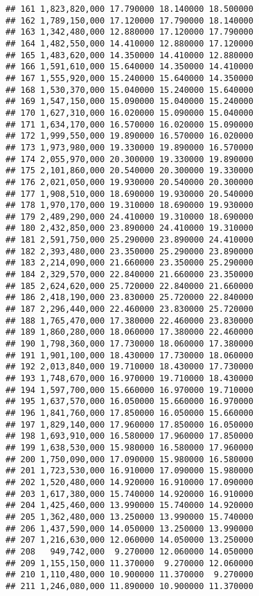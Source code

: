 \documentclass[]{article}
\begin{document}
\begin{verbatim}
## 161 1,823,820,000 17.790000 18.140000 18.500000
## 162 1,789,150,000 17.120000 17.790000 18.140000
## 163 1,342,480,000 12.880000 17.120000 17.790000
## 164 1,482,550,000 14.410000 12.880000 17.120000
## 165 1,483,620,000 14.350000 14.410000 12.880000
## 166 1,591,610,000 15.640000 14.350000 14.410000
## 167 1,555,920,000 15.240000 15.640000 14.350000
## 168 1,530,370,000 15.040000 15.240000 15.640000
## 169 1,547,150,000 15.090000 15.040000 15.240000
## 170 1,627,310,000 16.020000 15.090000 15.040000
## 171 1,634,170,000 16.570000 16.020000 15.090000
## 172 1,999,550,000 19.890000 16.570000 16.020000
## 173 1,973,980,000 19.330000 19.890000 16.570000
## 174 2,055,970,000 20.300000 19.330000 19.890000
## 175 2,101,860,000 20.540000 20.300000 19.330000
## 176 2,021,050,000 19.930000 20.540000 20.300000
## 177 1,908,510,000 18.690000 19.930000 20.540000
## 178 1,970,170,000 19.310000 18.690000 19.930000
## 179 2,489,290,000 24.410000 19.310000 18.690000
## 180 2,432,850,000 23.890000 24.410000 19.310000
## 181 2,591,750,000 25.290000 23.890000 24.410000
## 182 2,393,480,000 23.350000 25.290000 23.890000
## 183 2,214,090,000 21.660000 23.350000 25.290000
## 184 2,329,570,000 22.840000 21.660000 23.350000
## 185 2,624,620,000 25.720000 22.840000 21.660000
## 186 2,418,190,000 23.830000 25.720000 22.840000
## 187 2,296,440,000 22.460000 23.830000 25.720000
## 188 1,765,470,000 17.380000 22.460000 23.830000
## 189 1,860,280,000 18.060000 17.380000 22.460000
## 190 1,798,360,000 17.730000 18.060000 17.380000
## 191 1,901,100,000 18.430000 17.730000 18.060000
## 192 2,013,840,000 19.710000 18.430000 17.730000
## 193 1,748,670,000 16.970000 19.710000 18.430000
## 194 1,597,700,000 15.660000 16.970000 19.710000
## 195 1,637,570,000 16.050000 15.660000 16.970000
## 196 1,841,760,000 17.850000 16.050000 15.660000
## 197 1,829,140,000 17.960000 17.850000 16.050000
## 198 1,693,910,000 16.580000 17.960000 17.850000
## 199 1,638,530,000 15.980000 16.580000 17.960000
## 200 1,750,090,000 17.090000 15.980000 16.580000
## 201 1,723,530,000 16.910000 17.090000 15.980000
## 202 1,520,480,000 14.920000 16.910000 17.090000
## 203 1,617,380,000 15.740000 14.920000 16.910000
## 204 1,425,460,000 13.990000 15.740000 14.920000
## 205 1,362,480,000 13.250000 13.990000 15.740000
## 206 1,437,590,000 14.050000 13.250000 13.990000
## 207 1,216,630,000 12.060000 14.050000 13.250000
## 208   949,742,000  9.270000 12.060000 14.050000
## 209 1,155,150,000 11.370000  9.270000 12.060000
## 210 1,110,480,000 10.900000 11.370000  9.270000
## 211 1,246,080,000 11.890000 10.900000 11.370000

\end{verbatim}
\end{document}
